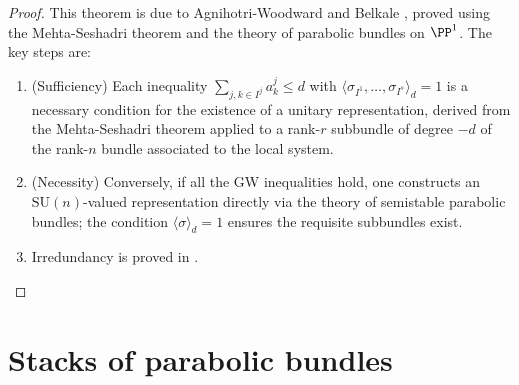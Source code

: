 \begin{proof}
  This theorem is due to Agnihotri-Woodward \cite{AW} and Belkale \cite{BLocal}, proved using the Mehta-Seshadri theorem and the theory of parabolic bundles on \(\PP^1\). The key steps are:
  \begin{enumerate}
    \item (Sufficiency) Each inequality \(\sum_{j,k \in I^j} a_k^j \leq d\) with \(\langle \sigma_{I^1}, \ldots, \sigma_{I^s} \rangle_d = 1\) is a necessary condition for the existence of a unitary representation, derived from the Mehta-Seshadri theorem applied to a rank-\(r\) subbundle of degree \(-d\) of the rank-\(n\) bundle associated to the local system.
    \item (Necessity) Conversely, if all the GW inequalities hold, one constructs an \(\mathrm{SU}(n)\)-valued representation directly via the theory of semistable parabolic bundles; the condition \(\langle \sigma \rangle_d = 1\) ensures the requisite subbundles exist.
    \item Irredundancy is proved in \cite[Remark 8.6]{BKq}.
  \end{enumerate}
\end{proof}

\section{Stacks of parabolic bundles}

